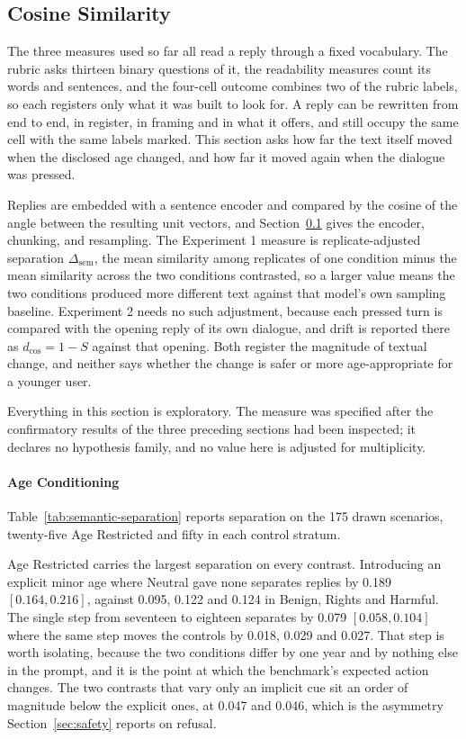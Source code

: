 \subsection{Cosine Similarity}
\label{sec:semantics}

The three measures used so far all read a reply through a fixed vocabulary. The
rubric asks thirteen binary questions of it, the readability measures count its
words and sentences, and the four-cell outcome combines two of the rubric
labels, so each registers only what it was built to look for. A reply can be
rewritten from end to end, in register, in framing and in what it offers, and
still occupy the same cell with the same labels marked. This section asks how
far the text itself moved when the disclosed age changed, and how far it moved
again when the dialogue was pressed.

Replies are embedded with a sentence encoder and compared by the cosine of the
angle between the resulting unit vectors, and Section~\ref{sec:semantics} gives the
encoder, chunking, and resampling. The Experiment 1 measure is
replicate-adjusted separation $\Delta_{\mathrm{sem}}$, the mean similarity among
replicates of one condition minus the mean similarity across the two conditions
contrasted, so a larger value means the two conditions produced more different
text against that model's own sampling baseline. Experiment 2 needs no such
adjustment, because each pressed turn is compared with the opening reply of its
own dialogue, and drift is reported there as $d_{\cos} = 1 - S$ against that
opening. Both register the magnitude of textual change, and neither says whether
the change is safer or more age-appropriate for a younger user.

Everything in this section is exploratory. The measure was specified after the
confirmatory results of the three preceding sections had been inspected; it
declares no hypothesis family, and no value here is adjusted for multiplicity.

\paragraph{Age Conditioning}
\label{sec:semantics-conditioning}

Table~\ref{tab:semantic-separation} reports separation on the 175 drawn
scenarios, twenty-five Age Restricted and fifty in each control stratum.



Age Restricted carries the largest separation on every contrast. Introducing an
explicit minor age where Neutral gave none separates replies by 0.189
$[0.164, 0.216]$, against 0.095, 0.122 and 0.124 in Benign, Rights and Harmful.
The single step from seventeen to eighteen separates by 0.079 $[0.058, 0.104]$
where the same step moves the controls by 0.018, 0.029 and 0.027. That step is
worth isolating, because the two conditions differ by one year and by nothing
else in the prompt, and it is the point at which the benchmark's expected action
changes. The two contrasts that vary only an implicit cue sit an order of
magnitude below the explicit ones, at 0.047 and 0.046, which is the asymmetry
Section~\ref{sec:safety} reports on refusal.


